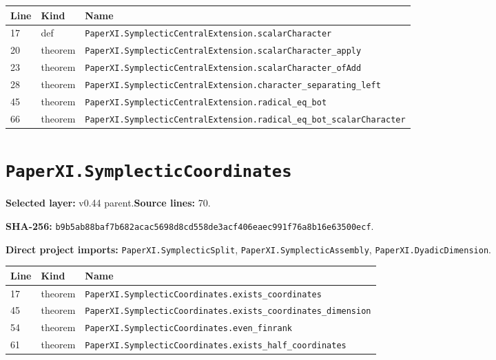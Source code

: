 \documentclass[10pt,oneside]{book}
\begin{document}
\begin{longtable}{@{}p{}p{}p{}@{}}\toprule Line&Kind&Name\\\midrule\endhead

17&def&\nolinkurl{PaperXI.SymplecticCentralExtension.scalarCharacter}\\

20&theorem&\nolinkurl{PaperXI.SymplecticCentralExtension.scalarCharacter_apply}\\

23&theorem&\nolinkurl{PaperXI.SymplecticCentralExtension.scalarCharacter_ofAdd}\\

28&theorem&\nolinkurl{PaperXI.SymplecticCentralExtension.character_separating_left}\\

45&theorem&\nolinkurl{PaperXI.SymplecticCentralExtension.radical_eq_bot}\\

66&theorem&\nolinkurl{PaperXI.SymplecticCentralExtension.radical_eq_bot_scalarCharacter}\\

\bottomrule\end{longtable}

\section{\texorpdfstring{\nolinkurl{PaperXI.SymplecticCoordinates}}{PaperXI.SymplecticCoordinates}}\label{module:PaperXI.SymplecticCoordinates}

\textbf{Selected layer:} v0.44 parent.\quad\textbf{Source lines:} 70.\par\textbf{SHA-256:} {\scriptsize\nolinkurl{b9b5ab88baf7b682acac5698d8cd558de3acf406eaec991f76a8b16e63500ecf}}.


\textbf{Direct project imports:} \nolinkurl{PaperXI.SymplecticSplit}, \nolinkurl{PaperXI.SymplecticAssembly}, \nolinkurl{PaperXI.DyadicDimension}.

\begin{longtable}{@{}p{}p{}p{}@{}}\toprule Line&Kind&Name\\\midrule\endhead

17&theorem&\nolinkurl{PaperXI.SymplecticCoordinates.exists_coordinates}\\

45&theorem&\nolinkurl{PaperXI.SymplecticCoordinates.exists_coordinates_dimension}\\

54&theorem&\nolinkurl{PaperXI.SymplecticCoordinates.even_finrank}\\

61&theorem&\nolinkurl{PaperXI.SymplecticCoordinates.exists_half_coordinates}\\

\bottomrule\end{longtable}
\end{document}
